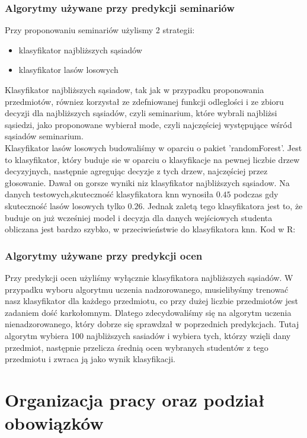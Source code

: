 \documentclass[licencjacka]{pracamgr}
\begin{document}
\subsection{Algorytmy używane przy predykcji seminariów}
Przy proponowaniu seminariów użylismy 2 strategii:
\begin{itemize}
 \item klasyfikator najbliższych sąsiadów
 \item klasyfikator lasów losowych
\end{itemize}
Klasyfikator najbliższych sąsiadow, tak jak w przypadku proponowania przedmiotów, równiez korzystał ze zdefniowanej funkcji
odleglości i ze zbioru decyzji dla najbliższych sąsiadów, czyli seminarium, które wybrali najbliżsi sąsiedzi, jako proponowane
wybierał mode, czyli najczęściej występujące wśród sąsiadów seminarium. \\
Klasyfikator lasów losowych budowaliśmy w oparciu o pakiet 'randomForest'. Jest to klasyfikator, który buduje sie w oparciu o
klasyfikacje na pewnej liczbie drzew decyzyjnych, następnie agregując decyzje z tych drzew, najczęściej przez głosowanie.
Dawał on gorsze wyniki niz klasyfikator najbliższych sąsiadow.
Na danych testowych,skuteczność klasyfikatora knn wynosiła $0.45$ podczas gdy skuteczność lasów losowych tylko $0.26$. Jednak
zaletą tego klasyfikatora jest to, że buduje on już wcześniej model i decyzja dla danych wejściowych studenta obliczana
jest bardzo szybko, w przeciwieństwie do klasyfikatora knn. Kod w R:

\subsection{Algorytmy używane przy predykcji ocen}
Przy predykcji ocen użyliśmy wyłącznie klasyfikatora najbliższych sąsiadów. W przypadku wyboru algorytmu uczenia nadzorowanego, musielibyśmy trenować nasz klasyfikator dla każdego przedmiotu, co przy dużej 
liczbie przedmiotów jest zadaniem dość karkołomnym. Dlatego zdecydowaliśmy się na algorytm uczenia nienadzorowanego, który dobrze się sprawdzał w poprzednich predykcjach. Tutaj algorytm wybiera 100 najbliższych sasiadów i wybiera tych, którzy wzięli dany przedmiot, następnie przelicza średnią ocen
wybranych studentów z tego przedmiotu i zwraca ją jako wynik klasyfikacji.


\chapter{Organizacja pracy oraz podział obowiązków} ~\\
\end{document}
